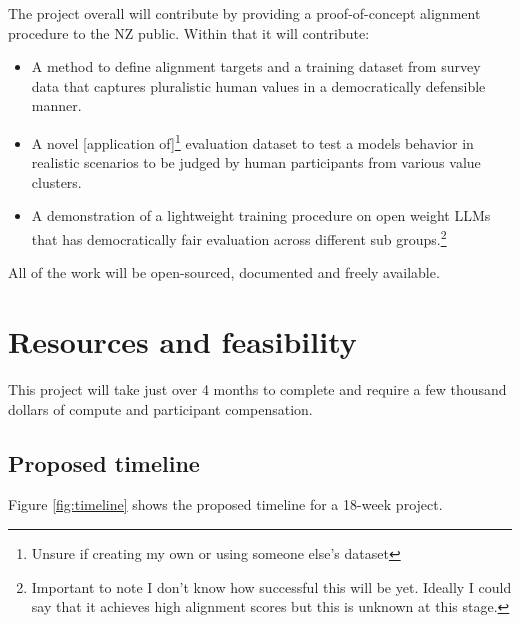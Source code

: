 The project overall will contribute by providing a proof-of-concept alignment procedure to the NZ public. Within that it will contribute:
\begin{itemize}
  \item A method to define alignment targets and a training dataset from survey data that captures pluralistic human values in a democratically defensible manner.
  \item A novel [application of]\footnote{Unsure if creating my own or using someone else's dataset} evaluation dataset to test a models behavior in realistic scenarios to be judged by human participants from various value clusters.
  \item A demonstration of a lightweight training procedure on open weight LLMs that has democratically fair evaluation across different sub groups.\footnote{Important to note I don't know how successful this will be yet. Ideally I could say that it achieves high alignment scores but this is unknown at this stage.}
\end{itemize}

\noindent All of the work will be open-sourced, documented and freely available.

\section{Resources and feasibility}

This project will take just over 4 months to complete and require a few thousand dollars of compute and participant compensation.

\subsection{Proposed timeline}

Figure \ref{fig:timeline} shows the proposed timeline for a 18-week project.

